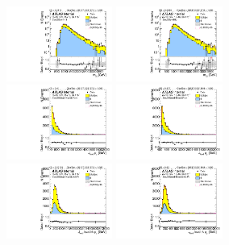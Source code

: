 \begin{figure}[htbp!]
\begin{center}
\includegraphics[angle=270, width=0.31\textwidth]{./figures/boosted/Prereweight/Moriond_TwoTag_split_Sideband_mHH_l_1.pdf}
\includegraphics[angle=270, width=0.31\textwidth]{./figures/boosted/Sideband/b77_TwoTag_split_Sideband_mHH_l_1.pdf}\\
\includegraphics[angle=270, width=0.31\textwidth]{./figures/boosted/Prereweight/Moriond_TwoTag_split_Sideband_leadHCand_Pt_m.pdf}
\includegraphics[angle=270, width=0.31\textwidth]{./figures/boosted/Sideband/b77_TwoTag_split_Sideband_leadHCand_Pt_m.pdf}\\
\includegraphics[angle=270, width=0.31\textwidth]{./figures/boosted/Prereweight/Moriond_TwoTag_split_Sideband_leadHCand_trk0_Pt.pdf}
\includegraphics[angle=270, width=0.31\textwidth]{./figures/boosted/Sideband/b77_TwoTag_split_Sideband_leadHCand_trk0_Pt.pdf}\\

\end{center}
\end{figure}
